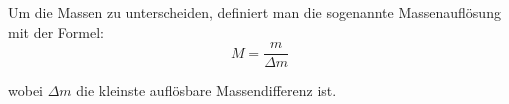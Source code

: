 

Um die Massen zu unterscheiden, definiert man die sogenannte Massenauflösung mit der Formel:
\begin{equation}
M = \frac{m}{\Delta m}
\end{equation} 

wobei $\Delta m$ die kleinste  auflösbare Massendifferenz ist.